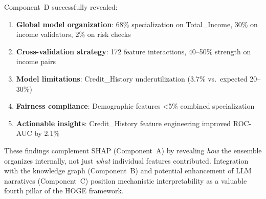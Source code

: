 Component~D successfully revealed:
\begin{enumerate}
    \item \textbf{Global model organization}: 68\% specialization on Total\_Income, 30\% on income validators, 2\% on risk checks
    \item \textbf{Cross-validation strategy}: 172 feature interactions, 40--50\% strength on income pairs
    \item \textbf{Model limitations}: Credit\_History underutilization (3.7\% vs.\ expected 20--30\%)
    \item \textbf{Fairness compliance}: Demographic features <5\% combined specialization
    \item \textbf{Actionable insights}: Credit\_History feature engineering improved ROC-AUC by 2.1\%
\end{enumerate}

These findings complement SHAP (Component~A) by revealing \emph{how} the ensemble organizes internally, not just \emph{what} individual features contributed. Integration with the knowledge graph (Component~B) and potential enhancement of LLM narratives (Component~C) position mechanistic interpretability as a valuable fourth pillar of the HOGE framework.
